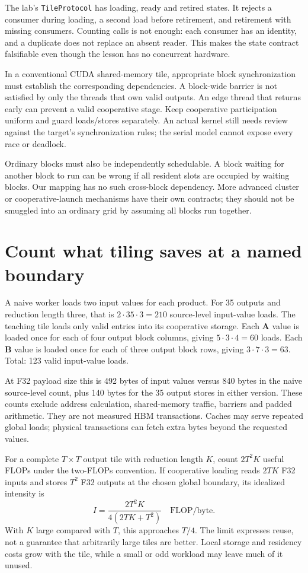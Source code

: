 The lab's \texttt{TileProtocol} has loading, ready and retired
states. It rejects a consumer during loading, a second
load before retirement, and retirement with missing
consumers. Counting calls is not enough: each consumer
has an identity, and a duplicate does not replace an
absent reader. This makes the state contract falsifiable
even though the lesson has no concurrent hardware.

In a conventional CUDA shared-memory tile, appropriate
block synchronization must establish the corresponding
dependencies. A block-wide barrier is not satisfied
by only the threads that own valid outputs. An edge
thread that returns early can prevent a valid cooperative
stage. Keep cooperative participation uniform and guard
loads/stores separately. An actual kernel still needs
review against the target's synchronization rules; the
serial model cannot expose every race or deadlock.

Ordinary blocks must also be independently schedulable.
A block waiting for another block to run can be wrong
if all resident slots are occupied by waiting blocks.
Our mapping has no such cross-block dependency. More
advanced cluster or cooperative-launch mechanisms have
their own contracts; they should not be smuggled into
an ordinary grid by assuming all blocks run together.

\section{Count what tiling saves at a named boundary}
A naive worker loads two input values for each product.
For 35 outputs and reduction length three, that is
$2\cdot35\cdot3=210$ source-level input-value loads.
The teaching tile loads only valid entries into its
cooperative storage. Each $\mathbf{A}$ value is loaded
once for each of four output block columns, giving
$5\cdot3\cdot4=60$ loads. Each $\mathbf{B}$ value is
loaded once for each of three output block rows,
giving $3\cdot7\cdot3=63$. Total: 123 valid
input-value loads.

At F32 payload size this is 492 bytes of input values
versus 840 bytes in the naive source-level count,
plus 140 bytes for the 35 output stores in either
version. These counts exclude address calculation,
shared-memory traffic, barriers and padded arithmetic.
They are not measured HBM transactions. Caches may
serve repeated global loads; physical transactions
can fetch extra bytes beyond the requested values.

For a complete $T\times T$ output tile with reduction
length $K$, count $2T^2K$ useful FLOPs under the
two-FLOPs convention. If cooperative loading reads
$2TK$ F32 inputs and stores $T^2$ F32 outputs
at the chosen global boundary, its idealized intensity is
\begin{equation}
 I=\frac{2T^2K}{4(2TK+T^2)}\quad\text{FLOP/byte}.
 \label{eq:foundation-tile-intensity}
\end{equation}
With $K$ large compared with $T$, this approaches $T/4$.
The limit expresses reuse, not a guarantee that arbitrarily
large tiles are better. Local storage and residency
costs grow with the tile, while a small or odd workload
may leave much of it unused.

